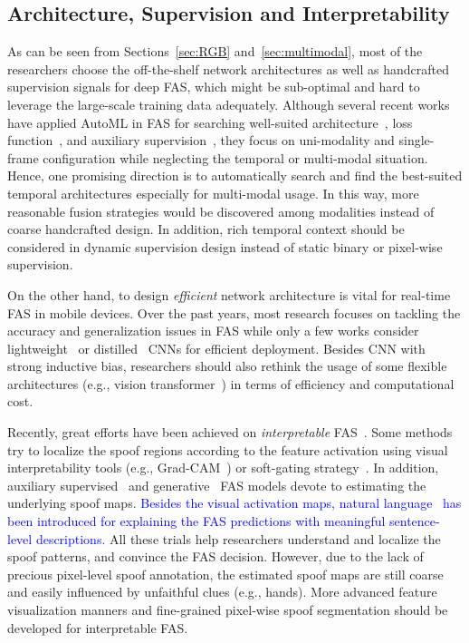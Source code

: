 \documentclass[10pt,journal,compsoc]{IEEEtran}
\begin{document}
\subsection{Architecture, Supervision and Interpretability}
As can be seen from Sections~\ref{sec:RGB} and~\ref{sec:multimodal}, most of the researchers choose the off-the-shelf network architectures as well as handcrafted supervision signals for deep FAS, which might be sub-optimal and hard to leverage the large-scale training data adequately. Although several recent works have applied AutoML in FAS for searching well-suited architecture~\cite{yu2020searching,yu2020fas2}, loss function~\cite{qin2020one}, and auxiliary supervision~\cite{qin2021meta}, they focus on uni-modality and single-frame configuration while neglecting the temporal or multi-modal situation. Hence, one promising direction is to automatically search and find the best-suited temporal architectures especially for multi-modal usage. In this way, more reasonable fusion strategies would be discovered among modalities instead of coarse handcrafted design. In addition, rich temporal context should be considered in dynamic supervision design instead of static binary or pixel-wise supervision.  

On the other hand, to design \textit{efficient} network architecture is vital for real-time FAS in mobile devices. Over the past years, most research focuses on tackling the accuracy and generalization issues in FAS while only a few works consider lightweight~\cite{yu2020auto2} or distilled~\cite{li2020face2} CNNs for efficient deployment. Besides CNN with strong inductive bias, researchers should also rethink the usage of some flexible architectures (e.g., vision transformer~\cite{yu2021transrppg,george2020effectiveness}) in terms of efficiency and computational cost. 


Recently, great efforts have been achieved on \textit{interpretable} FAS~\cite{sequeiraexploratory}. Some methods try to localize the spoof regions according to the feature activation using visual interpretability tools (e.g., Grad-CAM~\cite{selvaraju2017grad}) or soft-gating strategy~\cite{deb2020look}. In addition, auxiliary supervised~\cite{Liu2018Learning,yu2020face} and generative~\cite{jourabloo2018face,liu2020physics} FAS models devote to estimating the underlying spoof maps. \textcolor{blue}{Besides the visual activation maps, natural language~\cite{mirzaalian2021explaining} has been introduced for explaining the FAS predictions with meaningful sentence-level descriptions.} All these trials help researchers understand and localize the spoof patterns, and convince the FAS decision. However, due to the lack of precious pixel-level spoof annotation, the estimated spoof maps are still coarse and easily influenced by unfaithful clues (e.g., hands). More advanced feature visualization manners and fine-grained pixel-wise spoof segmentation should be developed for interpretable FAS.  
\end{document}
